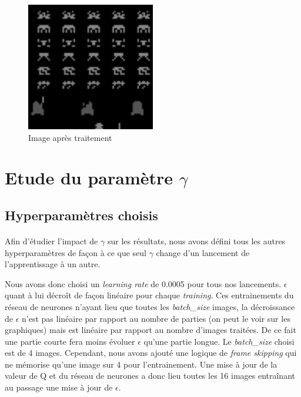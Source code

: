 \documentclass[12pt,oneside,a4paper]{article}
\begin{document}
    \begin{figure}[h]
        \centering
        \includegraphics[width=0.5\textwidth] {./processed_image.png}
        \caption{Image après traitement}
    \end{figure}



    \section{Etude du paramètre $\gamma$}
    \newpage

    \subsection{Hyperparamètres choisis}
    \paragraph{}
    Afin d'étudier l'impact de $\gamma$ sur les résultats, nous avons défini tous les autres hyperparamètres
    de façon à ce que seul $\gamma$ change d'un lancement de l'apprentissage à un autre.

    Nous avons donc choisi un \textit{learning rate} de 0.0005 pour tous nos lancements.
    $\epsilon$ quant à lui décroît de façon linéaire pour chaque \textit{training}. Ces entrainements
    du réseau de neurones n'ayant lieu que toutes les \textit{batch\_size} images, la décroissance
    de $\epsilon$ n'est pas linéaire par rapport au nombre de parties (on peut le voir sur les graphiques)
    mais est linéaire par rapport au nombre d'images traitées. De ce fait une partie courte fera moins
    évoluer $\epsilon$ qu'une partie longue. Le \textit{batch\_size} choisi est de 4 images. Cependant,
    nous avons ajouté une logique de \textit{frame skipping} qui ne mémorise qu'une image sur 4 pour l'entrainement.
    Une mise à jour de la valeur de Q et du réseau de neurones a donc lieu toutes les 16 images entraînant au passage
    une mise à jour de $\epsilon$.
\end{document}
